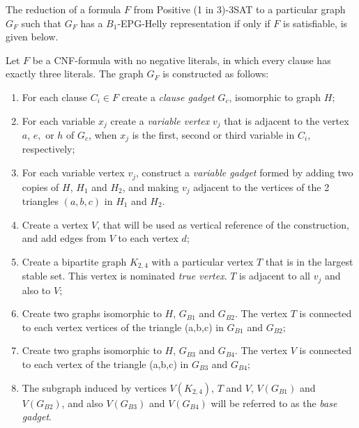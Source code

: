 \documentclass[runningheads]{llncs}
\begin{document}
The reduction of a formula $F$ from  {\sc Positive (1 in 3)-3SAT}  to a particular graph $G_F$ such that $G_F$ has a $B_{1}$-EPG-Helly representation if only if $F$ is satisfiable, is given below.

\begin{definition}\label{sec:reducao}
Let $F$ be a CNF-formula with no negative literals, in which every clause has exactly three literals. The graph $G_F$ is constructed as follows:

\begin{enumerate}
\item For each clause $C_i \in F$ create a  \textit{clause gadget} $G_{c}$, isomorphic to  graph $H$;

\item For each variable $x_{j}$ create a \emph{variable vertex} $v_{j}$ that is adjacent to the vertex $a$, $e,$ or $h$ of $G_c$, when $x_{j}$ is the first, second or third variable in $C_i$, respectively;

\item For each variable vertex $v_{j}$, construct a \emph{variable gadget} formed by adding two copies of $H$, $H_1$ and $H_2$, and making $v_j$ adjacent to the vertices of the 2 triangles $(a, b, c)$ in  $H_1$ and $H_2$.



\item Create a vertex $V$, that will be used as vertical reference of the construction, and add edges from $V$ to each vertex  $d$;%

\item Create a bipartite graph $K_{2,4}$ with a particular vertex $T$ that is in the largest stable set. This vertex is nominated \emph{true vertex}. $T$ is adjacent to all $v_{j}$ and also to $V$;

\item Create two  graphs isomorphic to $H$, $G_{B1}$ and $G_{B2}$. The vertex $T$ is connected to each vertex vertices of the triangle (a,b,c) in $G_{B1}$ and $G_{B2}$;


\item Create two graphs isomorphic  to $H$, $G_{B3}$ and $G_{B4}$. The vertex $V$ is connected to each vertex of the triangle (a,b,c) in $G_{B3}$ and $G_{B4}$;

\item The  subgraph induced by vertices $V(K_{2,4})$, $T$ and $V$,  $V(G_{B1})$ and $V(G_{B2})$, and also $V(G_{B3})$ and $V(G_{B4})$ will be referred to as the  \emph{base gadget}. 
\end{enumerate}
\end{definition}
\end{document}
